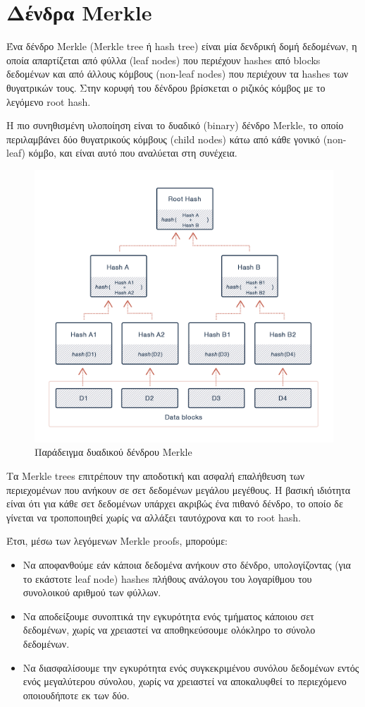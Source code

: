 \section{Δένδρα Merkle} \label{section:2-3-merkle-trees}

Ένα δένδρο Merkle (Merkle tree ή hash tree) είναι μία δενδρική δομή δεδομένων, η οποία απαρτίζεται από φύλλα (leaf nodes) που περιέχουν hashes από blocks δεδομένων και από άλλους κόμβους (non-leaf nodes) που περιέχουν τα hashes των θυγατρικών τους. Στην κορυφή του δένδρου βρίσκεται ο ριζικός κόμβος με το λεγόμενο root hash.\cite{2.3-merkle-tree}

Η πιο συνηθισμένη υλοποίηση είναι το δυαδικό (binary) δένδρο Merkle, το οποίο περιλαμβάνει δύο θυγατρικούς κόμβους (child nodes) κάτω από κάθε γονικό (non-leaf) κόμβο, και είναι αυτό που αναλύεται στη συνέχεια.

\begin{figure}[H]
	\centering
	\includegraphics[width=.85\textwidth]{assets/figures/chapter-2/2.3.merkle-tree.png}
	\caption{Παράδειγμα δυαδικού δένδρου Merkle}
\end{figure}

Τα Merkle trees επιτρέπουν την αποδοτική και ασφαλή επαλήθευση των περιεχομένων που ανήκουν σε σετ δεδομένων μεγάλου μεγέθους. Η βασική ιδιότητα είναι ότι για κάθε σετ δεδομένων υπάρχει ακριβώς ένα πιθανό δένδρο, το οποίο δε γίνεται να τροποποιηθεί χωρίς να αλλάξει ταυτόχρονα και το root hash. 

Έτσι, μέσω των λεγόμενων Merkle proofs, μπορούμε:
\begin{itemize}
	\item Να αποφανθούμε εάν κάποια δεδομένα ανήκουν στο δένδρο, υπολογίζοντας (για το εκάστοτε leaf node) hashes πλήθους ανάλογου του λογαρίθμου του συνολοικού αριθμού των φύλλων.
	\item Να αποδείξουμε συνοπτικά την εγκυρότητα ενός τμήματος κάποιου σετ δεδομένων, χωρίς να χρειαστεί να αποθηκεύσουμε ολόκληρο το σύνολο δεδομένων.
	\item Να διασφαλίσουμε την εγκυρότητα ενός συγκεκριμένου συνόλου δεδομένων εντός ενός μεγαλύτερου σύνολου, χωρίς να χρειαστεί να αποκαλυφθεί το περιεχόμενο οποιουδήποτε εκ των δύο.\cite{2.3-merkle-proofs-explained} 
\end{itemize}
